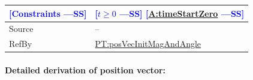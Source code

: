 \documentclass[12pt]{article}
\newcommand{\authornote}[3]{\textcolor{#1}{[#3 ---#2]}}
\newcommand{\authornote}[3]{}
\newcommand{\wss}[1]{\authornote{blue}{SS}{#1}}
\begin{document}
\begin{minipage}{\textwidth}
\begin{tabular}{>{\raggedright}p{}>{\raggedright\arraybackslash}p{}}
              \\ \midrule
\wss{Constraints} & \wss{$t \geq 0$} \wss{\hyperref[timeStartZero]{A:timeStartZero}}

\\ \midrule
Source & --
         
\\ \midrule
RefBy & \hyperref[PT:posVecInitMagAndAngle]{PT:posVecInitMagAndAngle} 
        
\\ \bottomrule
\end{tabular}
\end{minipage}

\paragraph{Detailed derivation of position vector:}
\label{GD:posVecDeriv}
\end{document}
